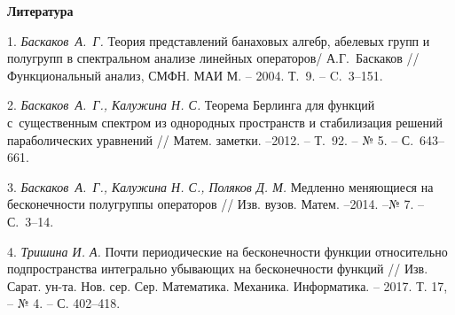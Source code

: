 \smallskip \centerline{\bf Литература}\nopagebreak

1. {\it Баскаков~А.~Г.} Теория представлений банаховых алгебр, абелевых групп и полугрупп в спектральном анализе линейных операторов/ А.Г.~Баскаков // Функциональный анализ, СМФН. МАИ М. -- 2004. Т.~9. -- C.~3--151.


2. {\it Баскаков~А.~Г., Калужина Н. С.} Теорема Берлинга для функций с~существенным спектром из однородных пространств и стабилизация решений параболических уравнений // Матем. заметки. --2012. -- Т.~92. -- № 5. -- С.~643--661.


3. {\it Баскаков~А.~Г., Калужина Н. С., Поляков Д. М.} Медленно меняющиеся на бесконечности полугруппы операторов // Изв. вузов. Матем. --2014. --№ 7. -- С.~3--14.

4. {\it Тришина И. А.} Почти периодические на бесконечности функции относительно
подпространства интегрально убывающих на бесконечности функций // Изв.
Сарат. ун-та. Нов. сер. Сер. Математика. Механика. Информатика. -- 2017. Т. 17, -- № 4. -- С. 402--418.
